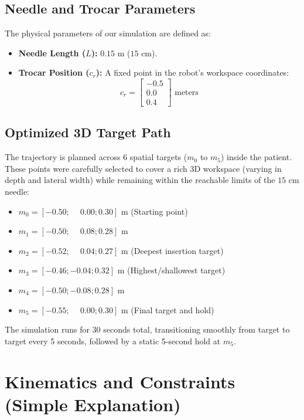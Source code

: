 \documentclass[11pt,a4paper]{article}
\begin{document}
\subsection{Needle and Trocar Parameters}
The physical parameters of our simulation are defined as:
\begin{itemize}
    \item \textbf{Needle Length ($L$):} $0.15\text{ m}$ ($15\text{ cm}$).
    \item \textbf{Trocar Position ($c_r$):} A fixed point in the robot's workspace coordinates:
    \begin{equation}
        c_r = \begin{bmatrix} -0.5 \\ 0.0 \\ 0.4 \end{bmatrix} \text{ meters}
    \end{equation}
\end{itemize}

\subsection{Optimized 3D Target Path}
The trajectory is planned across 6 spatial targets ($m_0$ to $m_5$) inside the patient. These points were carefully selected to cover a rich 3D workspace (varying in depth and lateral width) while remaining within the reachable limits of the $15\text{ cm}$ needle:
\begin{itemize}
    \item $m_0 = [-0.50; \phantom{-}0.00; 0.30]\text{ m}$ (Starting point)
    \item $m_1 = [-0.50; \phantom{-}0.08; 0.28]\text{ m}$
    \item $m_2 = [-0.52; \phantom{-}0.04; 0.27]\text{ m}$ (Deepest insertion target)
    \item $m_3 = [-0.46; -0.04; 0.32]\text{ m}$ (Highest/shallowest target)
    \item $m_4 = [-0.50; -0.08; 0.28]\text{ m}$
    \item $m_5 = [-0.55; \phantom{-}0.00; 0.30]\text{ m}$ (Final target and hold)
\end{itemize}

The simulation runs for 30 seconds total, transitioning smoothly from target to target every 5 seconds, followed by a static 5-second hold at $m_5$.

\section{Kinematics and Constraints (Simple Explanation)}
\end{document}
